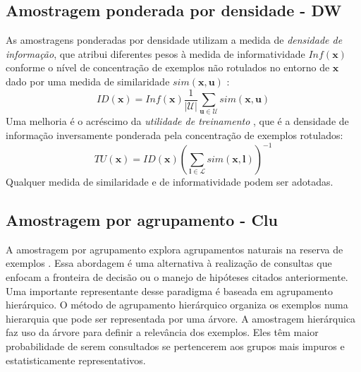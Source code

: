 \subsection{Amostragem ponderada por densidade - DW}\label{dw}
As amostragens ponderadas por densidade utilizam a medida de
\textit{densidade de informação}, que atribui diferentes pesos à medida de
informatividade $Inf(\bm{x})$ conforme o nível de concentração de exemplos não rotulados
no entorno de $\bm{x}$ dado por uma medida de similaridade $sim(\bm{x},\bm{u})$ \citep{settles2008curious}:
\begin{equation}\label{eqid}
 ID(\bm{x}) = Inf(\bm{x})\frac{1}{|\mathcal{U}|} \sum_{\bm{u} \in \mathcal{U}} sim(\bm{x},\bm{u})
\end{equation}
Uma melhoria é o acréscimo da \textit{utilidade de treinamento}
\citep{journals/coling/FujiiITT98},
que é a densidade de informação inversamente ponderada pela concentração
de exemplos rotulados:
\begin{equation}\label{eqtu}
 TU(\bm{x}) = ID(\bm{x}) (\sum_{\bm{l} \in \mathcal{L}} sim(\bm{x},\bm{l}))^{-1}
\end{equation}
Qualquer medida de similaridade e de informatividade podem ser adotadas.

\subsection{Amostragem por agrupamento - Clu}
A amostragem por agrupamento explora agrupamentos naturais na reserva de
exemplos \cite{journals/tcs/Dasgupta11}.
Essa abordagem é uma alternativa à realização de consultas que enfocam a
fronteira de decisão ou o manejo de hipóteses citados anteriormente.
Uma importante representante desse paradigma é 
baseada em agrupamento hierárquico.
O método de agrupamento hierárquico \citep{journals/cj/Murtagh83} 
organiza os exemplos numa hierarquia que pode ser representada por uma árvore.
A amostragem hierárquica faz uso da árvore para definir a relevância dos exemplos.
Eles têm maior probabilidade de serem consultados se pertencerem aos grupos
mais impuros e estatisticamente representativos.
